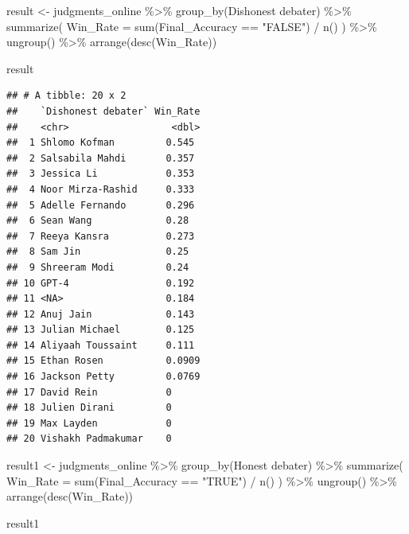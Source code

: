 \documentclass[
]{article}
\newenvironment{Shaded}{\begin{snugshade}}{\end{snugshade}}
\newcommand{\AttributeTok}[1]{\textcolor[rgb]{0.77,0.63,0.00}{#1}}
\newcommand{\FunctionTok}[1]{\textcolor[rgb]{0.00,0.00,0.00}{#1}}
\newcommand{\NormalTok}[1]{#1}
\newcommand{\OtherTok}[1]{\textcolor[rgb]{0.56,0.35,0.01}{#1}}
\newcommand{\SpecialCharTok}[1]{\textcolor[rgb]{0.00,0.00,0.00}{#1}}
\newcommand{\StringTok}[1]{\textcolor[rgb]{0.31,0.60,0.02}{#1}}
\begin{document}
\begin{Shaded}
\begin{Highlighting}[]
\NormalTok{result }\OtherTok{\textless{}{-}}\NormalTok{ judgments\_online }\SpecialCharTok{\%\textgreater{}\%}
  \FunctionTok{group\_by}\NormalTok{(}\StringTok{\textasciigrave{}}\AttributeTok{Dishonest debater}\StringTok{\textasciigrave{}}\NormalTok{) }\SpecialCharTok{\%\textgreater{}\%}
  \FunctionTok{summarize}\NormalTok{(}
    \AttributeTok{Win\_Rate =} \FunctionTok{sum}\NormalTok{(Final\_Accuracy }\SpecialCharTok{==} \StringTok{"FALSE"}\NormalTok{) }\SpecialCharTok{/} \FunctionTok{n}\NormalTok{()}
\NormalTok{  ) }\SpecialCharTok{\%\textgreater{}\%}
  \FunctionTok{ungroup}\NormalTok{() }\SpecialCharTok{\%\textgreater{}\%}
  \FunctionTok{arrange}\NormalTok{(}\FunctionTok{desc}\NormalTok{(Win\_Rate))}

\NormalTok{result}
\end{Highlighting}
\end{Shaded}

\begin{verbatim}
## # A tibble: 20 x 2
##    `Dishonest debater` Win_Rate
##    <chr>                  <dbl>
##  1 Shlomo Kofman         0.545 
##  2 Salsabila Mahdi       0.357 
##  3 Jessica Li            0.353 
##  4 Noor Mirza-Rashid     0.333 
##  5 Adelle Fernando       0.296 
##  6 Sean Wang             0.28  
##  7 Reeya Kansra          0.273 
##  8 Sam Jin               0.25  
##  9 Shreeram Modi         0.24  
## 10 GPT-4                 0.192 
## 11 <NA>                  0.184 
## 12 Anuj Jain             0.143 
## 13 Julian Michael        0.125 
## 14 Aliyaah Toussaint     0.111 
## 15 Ethan Rosen           0.0909
## 16 Jackson Petty         0.0769
## 17 David Rein            0     
## 18 Julien Dirani         0     
## 19 Max Layden            0     
## 20 Vishakh Padmakumar    0
\end{verbatim}

\begin{Shaded}
\begin{Highlighting}[]
\NormalTok{result1 }\OtherTok{\textless{}{-}}\NormalTok{ judgments\_online }\SpecialCharTok{\%\textgreater{}\%}
  \FunctionTok{group\_by}\NormalTok{(}\StringTok{\textasciigrave{}}\AttributeTok{Honest debater}\StringTok{\textasciigrave{}}\NormalTok{) }\SpecialCharTok{\%\textgreater{}\%}
  \FunctionTok{summarize}\NormalTok{(}
    \AttributeTok{Win\_Rate =} \FunctionTok{sum}\NormalTok{(Final\_Accuracy }\SpecialCharTok{==} \StringTok{"TRUE"}\NormalTok{) }\SpecialCharTok{/} \FunctionTok{n}\NormalTok{()}
\NormalTok{  ) }\SpecialCharTok{\%\textgreater{}\%}
  \FunctionTok{ungroup}\NormalTok{() }\SpecialCharTok{\%\textgreater{}\%}
  \FunctionTok{arrange}\NormalTok{(}\FunctionTok{desc}\NormalTok{(Win\_Rate))}

\NormalTok{result1}
\end{Highlighting}
\end{Shaded}
\end{document}
